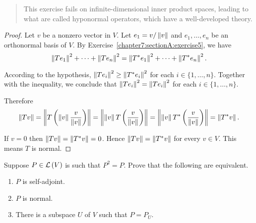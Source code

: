 \begin{quote}
    This exercise fails on infinite-dimensional inner product spaces, leading to what are called hyponormal operators, which have a well-developed theory.
\end{quote}

\begin{proof}
    Let $v$ be a nonzero vector in $V$. Let $e_{1} = v/\left\Vert{v}\right\Vert$ and $e_{1}, \ldots, e_{n}$ be an orthonormal basis of $V$. By Exercise~\ref{chapter7:sectionA:exercise5}, we have
    \[
        \left\Vert{Te_{1}}\right\Vert^{2} + \cdots + \left\Vert{Te_{n}}\right\Vert^{2} = \left\Vert{T^{*}e_{1}}\right\Vert^{2} + \cdots + \left\Vert{T^{*}e_{n}}\right\Vert^{2}.
    \]

    According to the hypothesis, $\left\Vert{Te_{i}}\right\Vert^{2}\geq \left\Vert{T^{*}e_{i}}\right\Vert^{2}$ for each $i\in\{1,\ldots, n\}$. Together with the inequality, we conclude that $\left\Vert{Te_{i}}\right\Vert^{2} = \left\Vert{Te_{i}}\right\Vert^{2}$ for each $i\in\{1,\ldots, n\}$.

    Therefore
    \[
        \left\Vert{Tv}\right\Vert = \left\Vert{T\left(\left\Vert{v}\right\Vert\frac{v}{\left\Vert{v}\right\Vert}\right)}\right\Vert = \left\Vert{\left\Vert{v}\right\Vert T\left(\frac{v}{\left\Vert{v}\right\Vert}\right)}\right\Vert = \left\Vert{\left\Vert{v}\right\Vert T^{*}\left(\frac{v}{\left\Vert{v}\right\Vert}\right)}\right\Vert = \left\Vert{T^{*}v}\right\Vert.
    \]

    If $v = 0$ then $\left\Vert{Tv}\right\Vert = \left\Vert{T^{*}v}\right\Vert = 0$. Hence $\left\Vert{Tv}\right\Vert = \left\Vert{T^{*}v}\right\Vert$ for every $v\in V$. This means $T$ is normal.
\end{proof}
\newpage

\begin{exercise}
    Suppose $P\in\mathcal{L}\left({V}\right)$ is such that $P^{2} = P$. Prove that the following are equivalent.
    \begin{enumerate}[label={(\alph*)}]
        \item $P$ is self-adjoint.
        \item $P$ is normal.
        \item There is a subspace $U$ of $V$ such that $P = P_{U}$.
    \end{enumerate}
\end{exercise}

